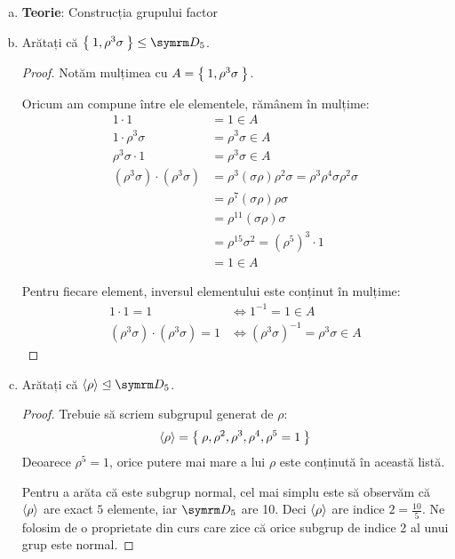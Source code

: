 \begin{enumerate}[(a)]
    \item \textbf{Teorie}: Construcția grupului factor

    \item Arătați că \(\Set{ 1, \rho^3 \sigma } \leq \dihedralgroup_5\).
    \begin{proof}
    Notăm mulțimea cu \(A = \Set{ 1, \rho^3 \sigma }\).

    Oricum am compune între ele elementele, rămânem în mulțime:
    \begin{align*}
        1 \cdot 1 &= 1 \in A \\
        1 \cdot \rho^3 \sigma &= \rho^3 \sigma \in A \\
        \rho^3 \sigma \cdot 1 &= \rho^3 \sigma \in A \\
        (\rho^3 \sigma) \cdot (\rho^3 \sigma) &= \rho^3 (\sigma \rho) \rho^2 \sigma = \rho^3 \rho^4 \sigma \rho^2 \sigma \\
        &= \rho^7 (\sigma \rho) \rho \sigma \\
        &= \rho^{11} (\sigma \rho) \sigma \\
        &= \rho^{15} \sigma^2 = (\rho^{5})^3 \cdot 1 \\
        &= 1 \in A
    \end{align*}

    Pentru fiecare element, inversul elementului este conținut în mulțime:
    \begin{align*}
        1 \cdot 1 = 1 &\iff 1^{-1} = 1 \in A \\
        (\rho^3 \sigma) \cdot (\rho^3 \sigma) = 1 &\iff (\rho^3 \sigma)^{-1} = \rho^3 \sigma \in A
    \end{align*}
    \end{proof}

    \item Arătați că \(\generatedby{\rho} \trianglelefteq \dihedralgroup_5\).
    \begin{proof}
    Trebuie să scriem subgrupul generat de \(\rho\):
    \[
        \left\langle \rho \right\rangle = \Set{ \rho, \rho^2, \rho^3, \rho^4, \rho^5 = 1 }
    \]
    Deoarece \(\rho^5 = 1\), orice putere mai mare a lui \(\rho\) este conținută în această listă.

    Pentru a arăta că este subgrup normal, cel mai simplu este să observăm că \(\left\langle \rho \right\rangle\) are exact \(5\) elemente, iar \(\dihedralgroup_5\) are 10. Deci \(\left\langle \rho \right\rangle\) are indice \(2 = \frac{10}{5}\). Ne folosim de o proprietate din curs care zice că orice subgrup de indice 2 al unui grup este normal.


\end{proof}
\end{enumerate}

